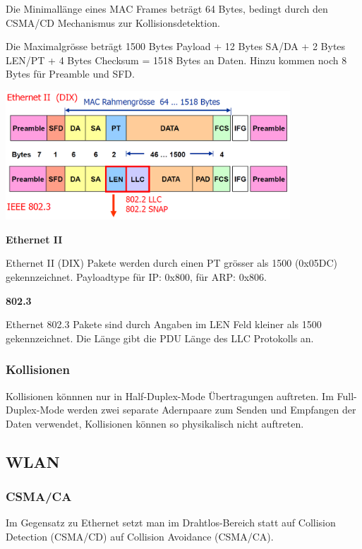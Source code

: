 Die Minimallänge eines MAC Frames beträgt 64 Bytes, bedingt durch den CSMA/CD
Mechanismus zur Kollisionsdetektion.

Die Maximalgrösse beträgt 1500 Bytes Payload + 12 Bytes SA/DA + 2 Bytes LEN/PT +
4 Bytes Checksum = 1518 Bytes an Daten. Hinzu kommen noch 8 Bytes für Preamble
und SFD.

\begin{center}
	\includegraphics[width=0.8\textwidth]{media/MACFrame.png}
\end{center}

\textbf{Ethernet II}

Ethernet II (DIX) Pakete werden durch einen PT grösser als 1500
(0x05DC) gekennzeichnet. Payloadtype für IP: 0x800, für ARP: 0x806.

\textbf{802.3}

Ethernet 802.3 Pakete sind durch Angaben im LEN Feld kleiner als 1500
gekennzeichnet. Die Länge gibt die PDU Länge des LLC Protokolls an.


\subsubsection{Kollisionen}

Kollisionen könnnen nur in Half-Duplex-Mode Übertragungen auftreten. Im
Full-Duplex-Mode werden zwei separate Adernpaare zum Senden und Empfangen der
Daten verwendet, Kollisionen können so physikalisch nicht auftreten.


\subsection{WLAN}

\subsubsection{CSMA/CA}

Im Gegensatz zu Ethernet setzt man im Drahtlos-Bereich statt auf Collision
Detection (CSMA/CD) auf Collision Avoidance (CSMA/CA).

